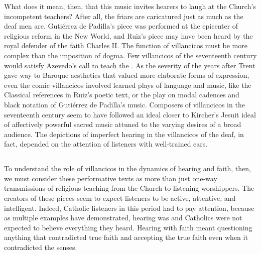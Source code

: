 What does it mean, then, that this music invites hearers to laugh at the
Church's incompetent teachers? 
After all, the friars are caricatured just as much as the deaf men are.
Gutiérrez de Padilla's piece was performed at the epicenter of religious reform
in the New World, and Ruiz's piece may have been heard by the royal defender of
the faith Charles II.  %
The function of villancicos must be more complex than the imposition of dogma.
Few villancicos of the seventeenth century would satisfy Azevedo's call to teach
the .  
As the severity of the years after Trent gave way to Baroque aesthetics that
valued more elaborate forms of expression, even the comic villancicos involved
learned plays of language and music, like the Classical references in Ruiz's
poetic text, or the play on modal cadences and black notation of Gutiérrez de
Padilla's music.
Composers of villancicos in the seventeenth century seem to have followed an
ideal closer to Kircher's Jesuit ideal of affectively powerful sacred music
attuned to the varying desires of a broad audience.
The depictions of imperfect hearing in the villancicos of the deaf, in fact,
depended on the attention of listeners with well-trained ears.

\subsection{}

To understand the role of villancicos in the dynamics of hearing and faith,
then, we must consider these performative texts as more than just one-way
transmissions of religious teaching from the Church to listening worshippers.
The creators of these pieces seem to expect listeners to be active, attentive,
and intelligent.
Indeed, Catholic listeners in this period had to pay attention, because as
multiple examples have demonstrated, hearing was  and Catholics were not expected to believe everything they heard.
Hearing with faith meant questioning anything that contradicted true faith and
accepting the true faith even when it contradicted the senses.


